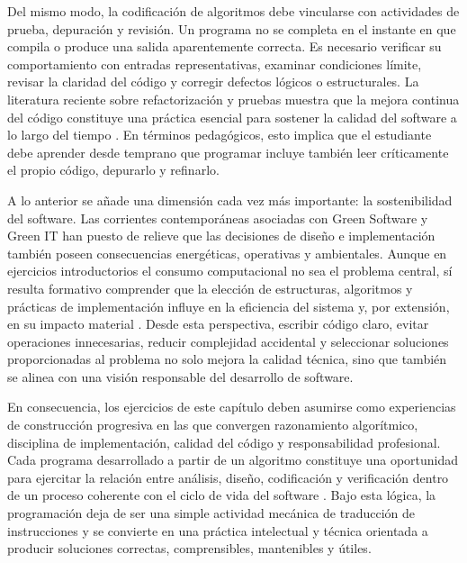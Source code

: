 \documentclass[12pt,twoside]{book}
\begin{document}
			Del mismo modo, la codificación de algoritmos debe vincularse con actividades de prueba, depuración y revisión. Un programa no se completa en el instante en que compila o produce una salida aparentemente correcta. Es necesario verificar su comportamiento con entradas representativas, examinar condiciones límite, revisar la claridad del código y corregir defectos lógicos o estructurales. La literatura reciente sobre refactorización y pruebas muestra que la mejora continua del código constituye una práctica esencial para sostener la calidad del software a lo largo del tiempo \cite{Abid2020Years,Lima2023Software,Martin2008Clean}. En términos pedagógicos, esto implica que el estudiante debe aprender desde temprano que programar incluye también leer críticamente el propio código, depurarlo y refinarlo.
			
			A lo anterior se añade una dimensión cada vez más importante: la sostenibilidad del software. Las corrientes contemporáneas asociadas con Green Software y Green IT han puesto de relieve que las decisiones de diseño e implementación también poseen consecuencias energéticas, operativas y ambientales. Aunque en ejercicios introductorios el consumo computacional no sea el problema central, sí resulta formativo comprender que la elección de estructuras, algoritmos y prácticas de implementación influye en la eficiencia del sistema y, por extensión, en su impacto material \cite{Calzati2025Ecosystemic,Leidig2021Competency}. Desde esta perspectiva, escribir código claro, evitar operaciones innecesarias, reducir complejidad accidental y seleccionar soluciones proporcionadas al problema no solo mejora la calidad técnica, sino que también se alinea con una visión responsable del desarrollo de software.
			
			En consecuencia, los ejercicios de este capítulo deben asumirse como experiencias de construcción progresiva en las que convergen razonamiento algorítmico, disciplina de implementación, calidad del código y responsabilidad profesional. Cada programa desarrollado a partir de un algoritmo constituye una oportunidad para ejercitar la relación entre análisis, diseño, codificación y verificación dentro de un proceso coherente con el ciclo de vida del software \cite{ISOIECIEEE2017SoftwareLifeCycle,ISOIECIEEE2018Requirements,Pressman2019Software,Sommerville2015Software}. Bajo esta lógica, la programación deja de ser una simple actividad mecánica de traducción de instrucciones y se convierte en una práctica intelectual y técnica orientada a producir soluciones correctas, comprensibles, mantenibles y útiles.
			
\end{document}
